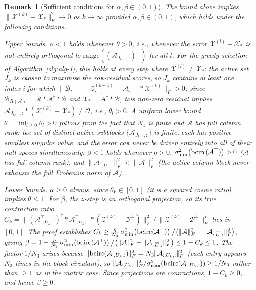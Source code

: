\documentclass[11pt]{article}
\newtheorem{remark}[theorem]{Remark}
\def\fm#1{\mathcal{#1}}
\begin{document}
\begin{remark}[Sufficient conditions for $\alpha,\beta\in(0,1)$]
\label{rem:alpha-beta}
The bound above implies $\|\fm X^{(k)}-\fm X_\ast\|_F^2\to 0$ as $k\to\infty$
provided $\alpha,\beta\in(0,1)$, which holds under the following conditions.

\textit{Upper bounds.}
$\alpha<1$ holds whenever $\theta>0$, i.e., whenever the error $\fm X^{(l)}-\fm X_\ast$ is not entirely orthogonal to $\mathrm{range}((\fm A_{J_l,:,:})^\top)$ for all $l$.
For the greedy selection of Algorithm~\ref{alg:alg-1}, this holds at every step where $\fm X^{(l)}\neq\fm X_\ast$: the active set $J_k$ is chosen to maximise the row-residual scores, so $J_k$ contains at least one index $i$ for which $\|\fm B_{i,:,:}-\fm Z^{(k+1)}_{i,:,:}-\fm A_{i,:,:}*\fm X^{(k)}\|_F>0$; since $\fm B_{R(\fm A)}=\fm A*\fm A^\dagger*\fm B$ and $\fm X_\ast=\fm A^\dagger*\fm B$, this non-zero residual implies $\fm A_{J_k,:,:}*(\fm X^{(k)}-\fm X_\ast)\neq\fm O$, i.e., $\theta_l>0$.
A uniform lower bound $\theta=\inf_{l\geq 0}\theta_l>0$ follows from the fact that $N_1$ is finite and $\fm A$ has full column rank: the set of distinct active subblocks $\{\fm A_{J_l,:,:}\}$ is finite, each has positive smallest singular value, and the error can never be driven entirely into all of their null spaces simultaneously.
$\beta<1$ holds whenever $\eta>0$,
$\sigma_{\min}^2\!\left(\bcirc(\fm A^\top)\right)>0$ ($\fm A$ has full column rank),
and $\|\fm A_{:,\overline{U},:}\|_F^2<\|\fm A\|_F^2$ (the active column-block
never exhausts the full Frobenius norm of $\fm A$).

\textit{Lower bounds.}
$\alpha\geq 0$ always, since $\theta_k\in[0,1]$ (it is a squared cosine ratio) implies $\theta\leq 1$.
For $\beta$, the $z$-step is an orthogonal projection, so its true contraction
ratio $C_k = \|\left(\fm A_{:,U_k,:}^\top\right)^\dagger *\fm A_{:,U_k,:}^\top *
(\fm Z^{(k)}-\fm B^\perp)\|_F^2\,\big/\,\|\fm Z^{(k)}-\fm B^\perp\|_F^2$
lies in $[0,1]$.
The proof establishes
$C_k\geq\frac{\eta}{N_3}\,\sigma_{\min}^2\!\left(\bcirc(\fm A^\top)\right)\big/
\bigl(\|\fm A\|_F^2-\|\fm A_{:,\overline{U},:}\|_F^2\bigr)$,
giving $\beta = 1-\frac{\eta}{N_3}\,\sigma_{\min}^2\!\left(\bcirc(\fm A^\top)\right)\big/
\bigl(\|\fm A\|_F^2-\|\fm A_{:,\overline{U},:}\|_F^2\bigr)\leq 1-C_k\leq 1$.
The factor $1/N_3$ arises because $\|\bcirc(\fm A_{:,U_k,:})\|_F^2 = N_3\|\fm A_{:,U_k,:}\|_F^2$
(each entry appears $N_3$ times in the block-circulant), so
$\|\fm A_{:,U_k,:}\|_F^2/\sigma_{\max}^2(\bcirc(\fm A_{:,U_k,:}))\geq 1/N_3$
rather than $\geq 1$ as in the matrix case.
Since projections are contractions, $1-C_k\geq 0$, and hence $\beta\geq 0$.
\end{remark}
\end{document}
